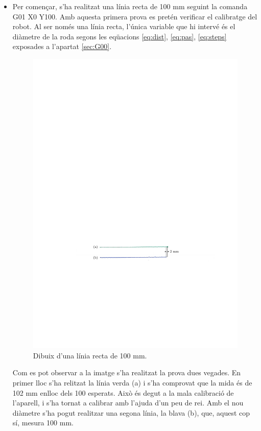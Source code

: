 \begin{itemize}
	\item Per començar, s'ha realitzat una línia recta de 100 mm seguint la comanda G01 X0 Y100. Amb aquesta primera prova es pretén verificar el calibratge del robot. Al ser només una línia recta, l'única variable que hi intervé és el diàmetre de la roda segons les eqüacions \ref{eq:dist}, \ref{eq:pas}, \ref{eq:steps} exposades a l'apartat \ref{sec:G00}.
	\begin{figure}[H]
		\centering
		\includegraphics{resultatLinia}
		\caption{Dibuix d'una línia recta de 100 mm.}
		\label{fig:linia}
	\end{figure}
	Com es pot observar a la imatge s'ha realitzat la prova dues vegades. En primer lloc s'ha relitzat la línia verda (a) i s'ha comprovat que la mida és de 102 mm enlloc dels 100 esperats. Això és degut a la mala calibració de l'aparell, i s'ha tornat a calibrar amb l'ajuda d'un peu de rei. Amb el nou diàmetre s'ha pogut realitzar una segona línia, la blava (b), que, aquest cop sí, mesura 100 mm. 
	

\end{itemize}
